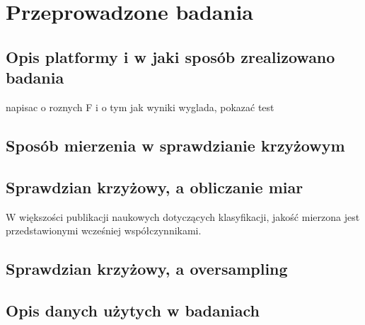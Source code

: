
\chapter{Przeprowadzone badania}

\section{Opis platformy i w jaki sposób zrealizowano badania}

 napisac o roznych F i o tym jak wyniki wyglada, pokazać test

\section{Sposób mierzenia w sprawdzianie krzyżowym}
\section{Sprawdzian krzyżowy, a obliczanie miar}
W większości publikacji naukowych dotyczących klasyfikacji, jakość mierzona jest przedstawionymi wcześniej współczynnikami. 
\section{Sprawdzian krzyżowy, a oversampling}

\section{Opis danych użytych w badaniach}

